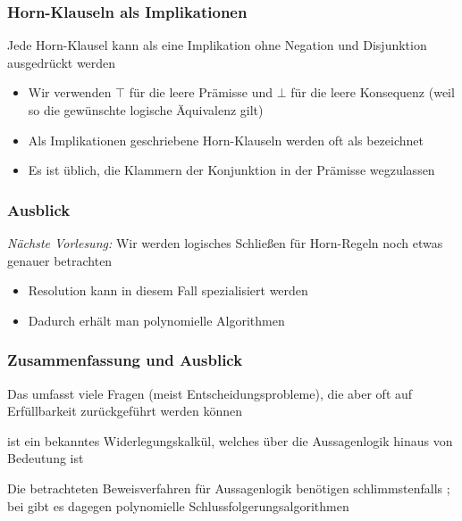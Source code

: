 \documentclass[aspectratio=1610,onlymath]{beamer}
\begin{document}
\begin{frame}\frametitle{Horn-Klauseln als Implikationen}

Jede Horn-Klausel kann als eine Implikation ohne Negation und Disjunktion ausgedrückt werden
\bigskip


\begin{itemize}
\item Wir verwenden $\top$ für die leere Prämisse und $\bot$ für die leere Konsequenz (weil so die gewünschte logische Äquivalenz gilt)
\item Als Implikationen geschriebene Horn-Klauseln werden oft als  bezeichnet
\item Es ist üblich, die Klammern der Konjunktion in der Prämisse wegzulassen
\end{itemize}

\end{frame}

\begin{frame}\frametitle{Ausblick}

\emph{Nächste Vorlesung:} Wir werden logisches Schließen für Horn-Regeln noch etwas genauer betrachten
\begin{itemize}
\item Resolution kann in diesem Fall spezialisiert werden
\item Dadurch erhält man polynomielle Algorithmen
\end{itemize}

\end{frame}


\begin{frame}\frametitle{Zusammenfassung und Ausblick}

Das  umfasst viele Fragen (meist Entscheidungsprobleme), die aber oft
auf Erfüllbarkeit zurückgeführt werden können
\bigskip

 ist ein bekanntes Widerlegungskalkül, welches über die Aussagenlogik hinaus von Bedeutung ist
\bigskip

Die betrachteten Beweisverfahren für Aussagenlogik benötigen schlimmstenfalls ; bei
 gibt es dagegen polynomielle Schlussfolgerungsalgorithmen\bigskip


\end{frame}
\end{document}
